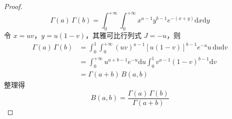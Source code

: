 \begin{proof}
    $$
    \Gamma(a) \, \Gamma(b) = \int_{0}^{+\infty} \int_{0}^{+\infty} x^{a-1} y^{b-1} e^{-(x+y)} \mathrm{d}x \mathrm{d}y
    $$
    令 $x = uv$，$y = u(1-v)$，其雅可比行列式 $J = -u$，则
    $$
    \begin{aligned}
        \Gamma(a) \, \Gamma(b) &= \int_{0}^{1} \int_{0}^{+\infty} (uv)^{a-1} [u(1-v)]^{b-1} e^{-u} u \, \mathrm{d}u \mathrm{d}v \\
        &= \int_{0}^{+\infty} u^{a+b-1} e^{-u} \mathrm{d}u \int_{0}^{1} v^{a-1} (1-v)^{b-1} \mathrm{d}v \\
        &= \Gamma(a+b) \, B(a,b)
    \end{aligned}
    $$
    整理得
    $$
    B(a,b) = \dfrac{\Gamma(a) \, \Gamma(b)}{\Gamma(a+b)}
    $$
\end{proof}






    
